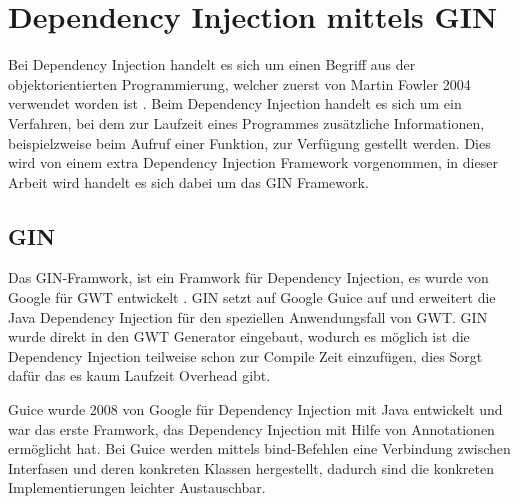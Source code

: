 \section{Dependency Injection mittels GIN} \label{GIN}
Bei Dependency Injection handelt es sich um einen Begriff aus der
objektorientierten Programmierung, welcher zuerst von Martin Fowler 2004
verwendet worden ist \cite{bib:DI}. Beim Dependency Injection handelt es sich um
ein Verfahren, bei dem zur Laufzeit eines Programmes zusätzliche Informationen,
beispielzweise beim Aufruf einer Funktion, zur Verfügung gestellt werden. Dies
wird von einem extra Dependency Injection Framework vorgenommen, in dieser
Arbeit wird handelt es sich dabei um das GIN Framework.

\subsection{GIN}
Das GIN-Framwork, ist ein Framwork für Dependency Injection, es wurde von Google
für GWT entwickelt \cite[GIN]{bib:gin}. GIN setzt auf Google Guice
\cite[Guice]{bib:guice} auf und erweitert die Java Dependency Injection für den
speziellen Anwendungsfall von GWT.  GIN wurde direkt in den GWT Generator
eingebaut, wodurch es möglich ist die Dependency Injection teilweise schon zur
Compile Zeit einzufügen, dies Sorgt dafür das es kaum Laufzeit Overhead gibt.

Guice wurde 2008 von Google für Dependency Injection mit Java entwickelt und war
das erste Framwork, das Dependency Injection mit Hilfe von Annotationen
ermöglicht hat. Bei Guice werden mittels bind-Befehlen eine Verbindung zwischen
Interfasen und deren konkreten Klassen hergestellt, dadurch sind die konkreten
Implementierungen leichter Austauschbar.

